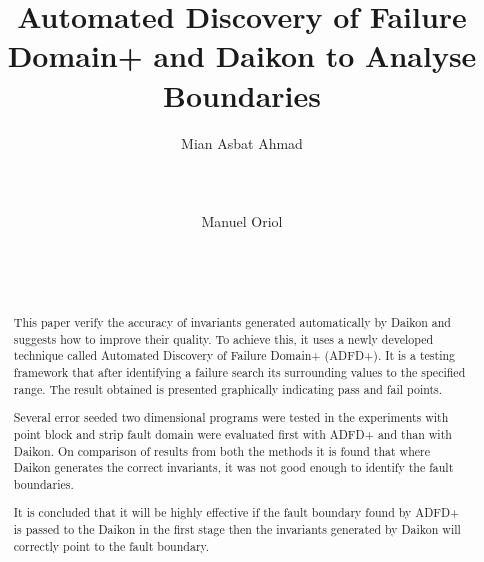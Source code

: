 \documentclass{acm_proc_article-sp}
\begin{document}
\title{Automated Discovery of Failure Domain+ and Daikon to Analyse Boundaries}


%
\author{
%
%
\alignauthor
Mian Asbat Ahmad\\
       \\
       \\
       \\
\alignauthor
Manuel Oriol \\
       \\
       \\
       \\
}



\maketitle
\begin{abstract}
This paper verify the accuracy of invariants generated automatically by Daikon and suggests how to improve their quality. To achieve this, it uses a newly developed technique called Automated Discovery of Failure Domain+ (ADFD+). It is a testing framework that after identifying a failure search its surrounding values to the specified range. The result obtained is presented graphically indicating pass and fail points.

Several error seeded two dimensional programs were tested in the experiments with point block and strip fault domain were evaluated first with ADFD+ and than with Daikon. On comparison of results from both the methods it is found that where Daikon generates the correct invariants, it was not good enough to identify the fault boundaries.

It is concluded that it will be highly effective if the fault boundary found by ADFD+ is passed to the Daikon in the first stage then the invariants generated by Daikon will correctly point to the fault boundary.

\end{abstract}
\end{document}
